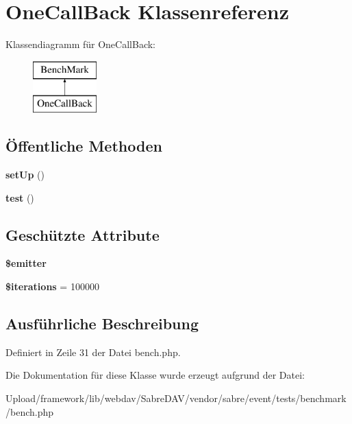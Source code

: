\hypertarget{class_one_call_back}{}\section{One\+Call\+Back Klassenreferenz}
\label{class_one_call_back}
Klassendiagramm für One\+Call\+Back\+:\begin{figure}[H]
\begin{center}
\leavevmode
\includegraphics[height=2.000000cm]{class_one_call_back}
\end{center}
\end{figure}
\subsection*{Öffentliche Methoden}
\begin{DoxyCompactItemize}
\item 
\mbox{\label{class_one_call_back_a8a4553fa89f60e6b4b34fd76da065866}} 
{\bfseries set\+Up} ()
\item 
\mbox{\label{class_one_call_back_ad33d3b804b2dc2b843b69b21dd38efde}} 
{\bfseries test} ()
\end{DoxyCompactItemize}
\subsection*{Geschützte Attribute}
\begin{DoxyCompactItemize}
\item 
\mbox{\label{class_one_call_back_ac1467815db8689c2a86d61a126f69441}} 
{\bfseries \$emitter}
\item 
\mbox{\label{class_one_call_back_a7f32d263c786095d546efdc4bc46f8ef}} 
{\bfseries \$iterations} = 100000
\end{DoxyCompactItemize}


\subsection{Ausführliche Beschreibung}


Definiert in Zeile 31 der Datei bench.\+php.



Die Dokumentation für diese Klasse wurde erzeugt aufgrund der Datei\+:\begin{DoxyCompactItemize}
\item 
Upload/framework/lib/webdav/\+Sabre\+D\+A\+V/vendor/sabre/event/tests/benchmark/bench.\+php\end{DoxyCompactItemize}
